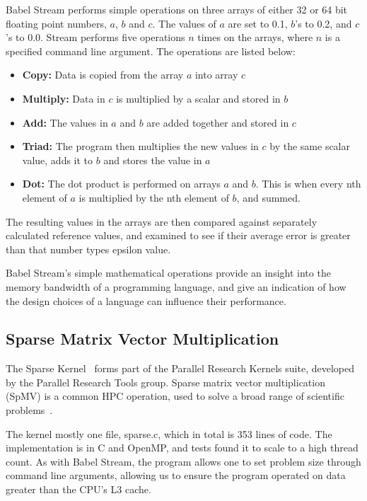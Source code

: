 Babel Stream performs simple operations on three arrays of either 32 or 64 bit floating point numbers, $a$, $b$ and $c$. The values of $a$ are set to 0.1, $b$'s to 0.2, and $c$'s to 0.0. Stream performs five operations $n$ times on the arrays, where $n$ is a specified command line argument. The operations are listed below:
\begin{itemize}
  \item \textbf{Copy:} Data is copied from the array $a$ into array $c$
  \item \textbf{Multiply:} Data in $c$ is multiplied by a scalar and stored in $b$
  \item \textbf{Add:} The values in $a$ and $b$ are added together and stored in $c$
  \item \textbf{Triad:} The program then multiplies the new values in $c$ by the same scalar value, adds it to $b$ and stores the value in $a$
  \item \textbf{Dot:} The dot product is performed on arrays $a$ and $b$. This is when every nth element of $a$ is multiplied by the nth element of $b$, and summed.
\end{itemize}
The resulting values in the arrays are then compared against separately calculated reference values, and examined to see if their average error is greater than that number types epsilon value.

Babel Stream's simple mathematical operations provide an insight into the memory bandwidth of a programming language, and give an indication of how the  design choices of a language can influence their performance.

\subsection{Sparse Matrix Vector Multiplication}

The Sparse Kernel~\cite{ParResSparse} forms part of the Parallel Research Kernels suite, developed by the Parallel Research Tools group. Sparse matrix vector multiplication (SpMV) is a common HPC operation, used to solve a broad range of scientific problems~\cite{Sedaghati:2015, spMVGPU, DBLP:journals}.

The kernel mostly one file, sparse.c, which in total is 353 lines of code. The implementation is in C and OpenMP, and tests found it to scale to a high thread count. As with Babel Stream, the program allows one to set problem size through command line arguments, allowing us to ensure the program operated on data greater than the CPU's L3 cache.

